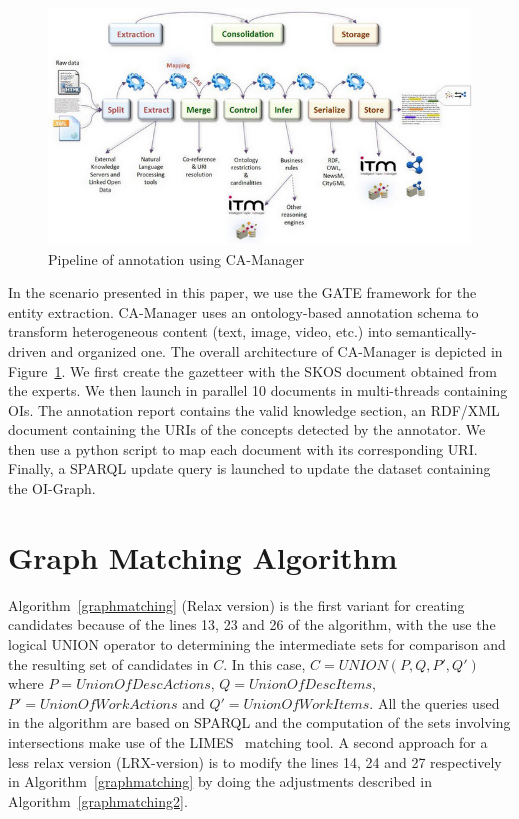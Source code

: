 \documentclass[a4paper,english,submission]{rnti}  %
\begin{document}
\begin{figure}[!htb]
\centering
\includegraphics[scale=0.4]{img/cam_fig1.png}
\caption{Pipeline of annotation using CA-Manager}
\label{figcam}
\end{figure}


In the scenario presented in this paper, we use the GATE framework for the entity extraction. CA-Manager uses an ontology-based annotation schema to transform heterogeneous content (text, image, video, etc.) into semantically-driven and organized one. The overall architecture of CA-Manager is depicted in Figure~\ref{figcam}. 
We first create the gazetteer with the SKOS document obtained from the experts. We then launch in parallel 10  documents in multi-threads containing OIs. The annotation report contains the valid knowledge section, an RDF/XML document containing the URIs of the concepts detected by the annotator. We then use a python script to map each document with its corresponding URI. Finally, a SPARQL update query is launched to update the dataset containing the OI-Graph.   



\section{Graph Matching Algorithm}
\label{sec:matching}

Algorithm~\ref{graphmatching} (Relax version) is the first variant for creating candidates because of the lines 13, 23 and 26 of the algorithm, with the use the logical UNION operator to determining the intermediate sets for comparison and the resulting set of candidates in $C$. In this case, $C = UNION(P,Q,P',Q')$ where $P = UnionOfDescActions$, $Q = UnionOfDescItems$, $P' = UnionOfWorkActions$ and $Q' = UnionOfWorkItems$. All the queries used in the algorithm are based on SPARQL and the computation of the sets involving intersections make use of the LIMES~\citep{ngonga11} matching tool.  A second approach for a less relax version (LRX-version) is to modify the lines 14, 24 and 27 respectively in Algorithm~\ref{graphmatching} by doing the adjustments described in Algorithm~\ref{graphmatching2}.
\end{document}
